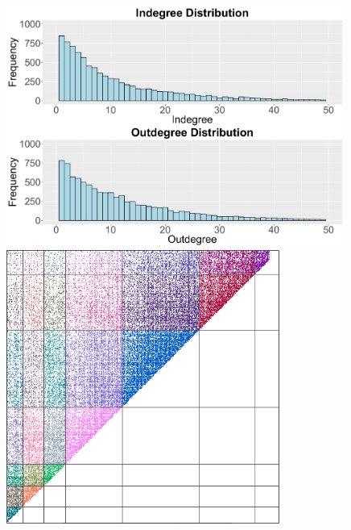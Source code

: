 \documentclass[headsepline=true, abstracton]{scrartcl}
\begin{document}
\begin{figure}[bt]
	\centering
	\begin{minipage}{.37\linewidth}
		\centering
		\includegraphics[width = 0.99\textwidth]{degree_distribution.pdf}
		\includegraphics[width = 0.8\textwidth]{data_mat.png}%
	\end{minipage}%
	\begin{minipage}{.63\linewidth}

\end{minipage}
\end{figure}
\end{document}
